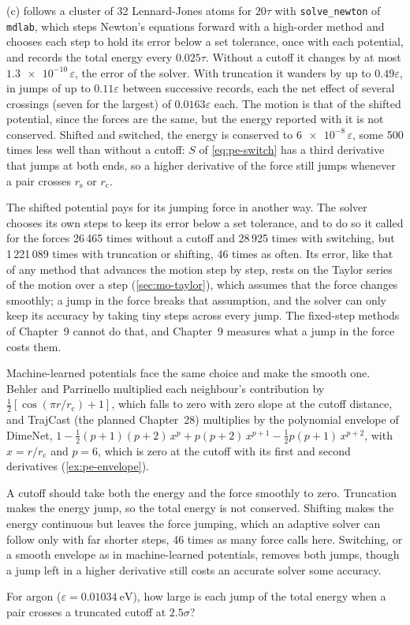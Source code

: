 (c) follows a cluster of 32 Lennard-Jones atoms for
$20\tau$ with \texttt{solve\_newton} of \texttt{mdlab}, which steps
Newton's equations forward with a high-order method and chooses each step
to hold its error below a set tolerance, once with each potential, and
records the total energy every $0.025\tau$. Without a cutoff it changes
by at most $\num{1.3e-10}\,\varepsilon$, the error of the solver. With
truncation it wanders by up to $0.49\varepsilon$, in jumps of up to
$0.11\varepsilon$ between successive records, each the net effect of
several crossings (seven for the largest) of $0.0163\varepsilon$ each. The motion is that of the shifted potential,
since the forces are the same, but the energy reported with it is not
conserved. Shifted and switched, the energy is
conserved to $\num{6e-8}\,\varepsilon$, some 500 times less well than
without a cutoff: $S$ of \cref{eq:pe-switch} has a third derivative that
jumps at both ends, so a higher derivative of the force still jumps
whenever a pair crosses $r_{\mathrm s}$ or $r_{\mathrm c}$.

The shifted potential pays for its jumping force in another way. The
solver chooses its own steps to keep its error below a set tolerance,
and to do so it called for the forces 26\,465 times without a cutoff and
28\,925 times with switching, but 1\,221\,089 times with truncation or
shifting, 46 times as often. Its error, like that of any method that advances
the motion step by step, rests on the Taylor series of the motion over a
step (\cref{sec:mo-taylor}), which assumes that the force changes
smoothly; a jump in the force breaks that assumption, and the solver can
only keep its accuracy by taking tiny steps across every jump. The
fixed-step methods of Chapter~9 cannot do that, and Chapter~9 measures
what a jump in the force costs them.

Machine-learned potentials face the same choice and make the smooth one.
Behler and Parrinello multiplied each neighbour's contribution by $\frac12
[\cos(\pi r/r_{\mathrm c}) + 1]$, which falls to zero with zero slope at
the cutoff distance\cite{BehlerParrinello2007}, and TrajCast (the planned Chapter~28)
multiplies by the polynomial envelope of DimeNet\cite{Gasteiger2020}, $1 - \frac12(p + 1)(p + 2)\,x^p +
p(p + 2)\,x^{p + 1} - \frac12 p(p + 1)\,x^{p + 2}$, with $x = r/r_{\mathrm
c}$ and $p = 6$, which is zero at the cutoff with its first and second
derivatives (\cref{ex:pe-envelope}).

\begin{keyidea}
A cutoff should take both the energy and the force smoothly to zero.
Truncation makes the energy jump, so the total energy is not conserved.
Shifting makes the energy continuous but leaves the force jumping, which
an adaptive solver can follow only with far shorter steps, 46 times as
many force calls here. Switching, or a smooth envelope as in
machine-learned potentials, removes both jumps, though a jump left in a
higher derivative still costs an accurate solver some accuracy.
\end{keyidea}


\begin{selfcheck}
For argon ($\varepsilon = \SI{0.01034}{\electronvolt}$), how large is each
jump of the total energy when a pair crosses a truncated cutoff at
$2.5\sigma$?
\end{selfcheck}
